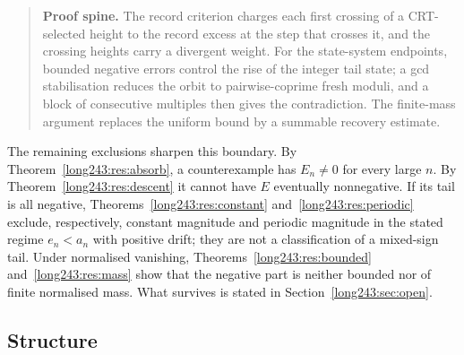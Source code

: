 \begin{quote}
\smallskip
\textbf{Proof spine.}
The record criterion charges each first crossing of a CRT-selected height to
the record excess at the step that crosses it, and the crossing heights carry
a divergent weight.  For the state-system endpoints, bounded negative errors
control the rise of the integer tail state; a gcd stabilisation reduces the
orbit to pairwise-coprime fresh moduli, and a block of consecutive multiples
then gives the contradiction.  The finite-mass argument replaces the uniform
bound by a summable recovery estimate.
\end{quote}

\noindent The remaining exclusions sharpen this boundary.  By
Theorem~\ref{long243:res:absorb}, a counterexample has $E_n\ne0$ for
every large $n$.  By Theorem~\ref{long243:res:descent} it cannot have $E$ eventually
nonnegative.  If its tail is all negative, Theorems~\ref{long243:res:constant}
and~\ref{long243:res:periodic} exclude, respectively, constant magnitude and periodic
magnitude in the stated regime $e_n<a_n$ with positive drift; they are not a
classification of a mixed-sign tail.  Under normalised vanishing,
Theorems~\ref{long243:res:bounded} and~\ref{long243:res:mass} show that the negative part is
neither bounded nor of finite normalised mass.  What survives is stated in
Section~\ref{long243:sec:open}.

\subsection*{Structure}

